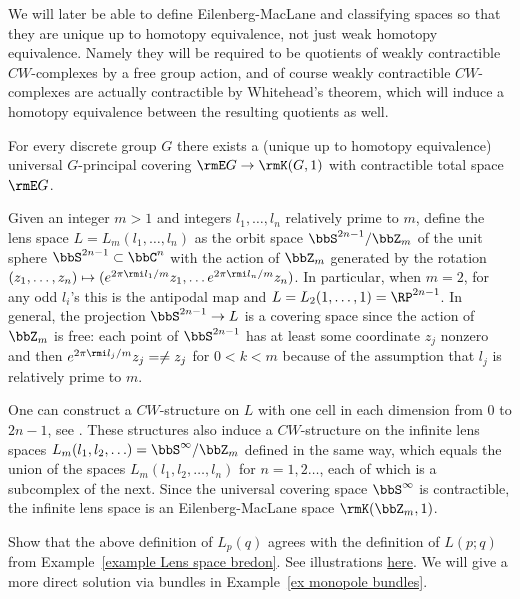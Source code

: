\begin{rem}
    We will later be able to define Eilenberg-MacLane and classifying spaces so that they are unique up to homotopy equivalence, not just weak homotopy equivalence. Namely they will be required to be quotients of weakly contractible $CW$-complexes by a free group action, and of course weakly contractible $CW$-complexes are actually contractible by Whitehead's theorem, which will induce a homotopy equivalence between the resulting quotients as well.
\end{rem}


\begin{cor}
    For every discrete group $G$ there exists a (unique up to homotopy equivalence) universal $G$-principal covering $\rmE G\to \rmK(G,1)$ with contractible total space $\rmE G$.
\end{cor}

\begin{example}\label{example Lens spaces}
    Given an integer $m>1$ and integers $l_1,\ldots,l_n$ relatively prime to $m$, define the lens space $L=L_m(l_1,\ldots,l_n)$ as the orbit space $\bbS^{2n-1}\slash \bbZ_m$ of the unit sphere $\bbS^{2n-1}\subset\bbC^n$ with the action of $\bbZ_m$ generated by the rotation $(z_1,\ldots,z_n)\mapsto (e^{2\pi\rmi l_1/m}z_1,\ldots e^{2\pi\rmi l_n/m} z_n)$. In particular, when $m=2$, for any odd $l_i$'s this is the antipodal map and $L=L_2(1,\ldots,1)=\RP^{2n-1}$. In general, the projection $\bbS^{2n-1}\to L$ is a covering space since the action of $\bbZ_m$ is free: each point of $\bbS^{2n-1}$ has at least some coordinate $z_j$ nonzero and then $e^{2\pi\rmi l_j/m}z_j=\neq z_j$ for $0<k<m$ because of the assumption that $l_j$ is relatively prime to $m$.

    One can construct a $CW$-structure on $L$ with one cell in each dimension from $0$ to $2n-1$, see \cite[Example~2.43]{Hatcher}. These structures also induce a $CW$-structure on the infinite lens spaces $L_m(l_1,l_2,\ldots)=\bbS^\infty\slash \bbZ_m$ defined in the same way, which equals the union of the spaces $L_m(l_1,l_2,\ldots,l_n)$ for $n=1,2\ldots$, each of which is a subcomplex of the next. Since the universal covering space $\bbS^\infty$ is contractible, the infinite lens space is an Eilenberg-MacLane space $\rmK(\bbZ_m,1)$.
\end{example}


\begin{xca}\label{xca two definitions of lens spaces}
    Show that the above definition of $L_p(q)$ agrees with the definition of $L(p;q)$ from Example~\ref{example Lens space bredon}. See illustrations \href{https://math.stackexchange.com/a/1186808/31363}{here}. We will give a more direct solution via bundles in Example~\ref{ex monopole bundles}.
\end{xca}










